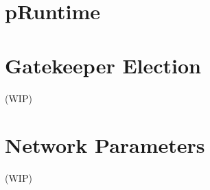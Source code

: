 \clearpage
\appendix

\section{pRuntime}







\section{Gatekeeper Election}

(WIP)

\section{Network Parameters}

(WIP)

